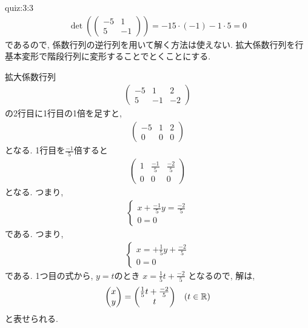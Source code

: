 \begin{answerof}{quiz:3:3}
  \begin{align*}
    \det(\begin{pmatrix}-5&1\\5&-1\end{pmatrix})=-15\cdot(-1)-1\cdot 5 =0
  \end{align*}
  であるので, 係数行列の逆行列を用いて解く方法は使えない.
  拡大係数行列を行基本変形で階段行列に変形することでとくことにする.

  拡大係数行列
  \begin{align*}
    \begin{pmatrix}-5&1&2\\5&-1&-2\end{pmatrix}
  \end{align*}
  の2行目に1行目の1倍を足すと,
  \begin{align*}
    \begin{pmatrix}-5&1&2\\0&0&0\end{pmatrix}
  \end{align*}
  となる. 1行目を$\frac{-1}{5}$倍すると
  \begin{align*}
    \begin{pmatrix}1&\frac{-1}{5}&\frac{-2}{5}\\0&0&0\end{pmatrix}
  \end{align*}
  となる. つまり,
  \begin{align*}
    \begin{cases}
      x+\frac{-1}{5}y=\frac{-2}{5}\\
      0=0
    \end{cases}
  \end{align*}
  である.
  つまり,
  \begin{align*}
    \begin{cases}
      x=+\frac{1}{5}y+\frac{-2}{5}\\
      0=0
    \end{cases}
  \end{align*}
  である.
  1つ目の式から, $y=t$のとき
  $x=\frac{1}{5}t+\frac{-2}{5}$
  となるので,
  解は,
  \begin{align*}
      \begin{pmatrix}x\\y\end{pmatrix}
        &=\begin{pmatrix}\frac{1}{5}t+\frac{-2}{5}\\t\end{pmatrix}
        &(t\in \mathbb{R})
  \end{align*}
  と表せられる.
\end{answerof}

